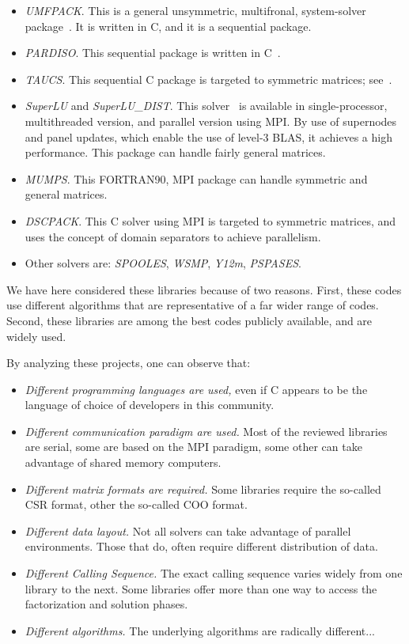 \documentclass[acmtocl]{acmtrans2m}
\begin{document}
\begin{itemize}
\item
{\sl UMFPACK}. This is a general unsymmetric, multifronal, system-solver
package~\cite{umfpack-home-page}. It is written in C, and it is a sequential
package.
\item
{\sl PARDISO}. This sequential package is written in
C~\cite{oskl:04-etna,sg:04-fgcs}.
\item
{\sl TAUCS}. This sequential C package is targeted to symmetric matrices;
see~\cite{irony04parallel,rotkin04design,rozin04locality}.
\item 
{\sl SuperLU} and {\sl SuperLU\_DIST}. This solver~\cite{superlu-manual} is
available in single-processor, multithreaded version, and parallel version
using MPI. By use of supernodes and panel updates, which enable the use of
level-3 BLAS, it achieves a high performance. This package can handle fairly
general matrices.
\item
{\sl MUMPS}. This FORTRAN90, MPI package can handle symmetric and general
matrices.
\item
{\sl DSCPACK}. This C solver using MPI is targeted to symmetric matrices, and
uses the concept of domain separators to achieve parallelism.
\item
Other solvers are: {\sl SPOOLES}, {\sl WSMP}, {\sl Y12m}, {\sl PSPASES}.
\end{itemize}

We have here considered these libraries because of two reasons.
First, these codes use different algorithms that are
representative of a far wider range of codes. Second, these libraries are
among the best codes publicly available, and are widely used. 

By analyzing these projects, one can observe that:
\begin{itemize}
\item {\sl Different programming languages are used,}  even if C appears to be
  the language of choice of developers in this community.

\item {\sl Different communication paradigm are used.} 
 Most of the reviewed libraries are serial, some are based on the MPI
 paradigm, some other can take advantage of shared memory computers.

\item {\sl Different matrix formats are required.} Some libraries require the
so-called CSR format, other the so-called COO format. 

\item {\sl Different data layout.} Not all solvers can take advantage of
parallel environments. Those that do, often require different distribution of
data. 

\item {\sl Different Calling Sequence.} The exact calling sequence varies
widely from one library to the next.  Some libraries offer more than one way
to access the factorization and solution phases.

\item {\sl Different algorithms.} The underlying algorithms are radically
different...

\end{itemize}
\end{document}
